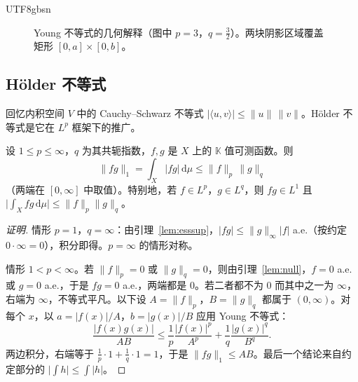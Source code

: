 \documentclass[11pt]{article}
\newcommand{\K}{\mathbb{K}}
\newcommand{\norm}[1]{\lVert #1\rVert}
\newcommand{\dmu}{\,\mathrm{d}\mu}
\begin{document}
\begin{CJK*}{UTF8}{gbsn}
\begin{figure}[H]
\centering
{}
\caption{Young 不等式的几何解释（图中 $p=3$，$q=\tfrac32$）。两块阴影区域覆盖矩形 $[0,a]\times[0,b]$。}
\label{fig:young}
\end{figure}

\subsection{Hölder 不等式}

回忆内积空间 $V$ 中的 Cauchy--Schwarz 不等式 $|\langle u,v\rangle|\le\norm{u}\,\norm{v}$。Hölder 不等式是它在 $L^{p}$ 框架下的推广。

\begin{theorem}\label{thm:holder}
设 $1\le p\le\infty$，$q$ 为其共轭指数，$f,g$ 是 $X$ 上的 $\K$ 值可测函数。则
\[
\norm{fg}_{1}=\int_{X}|fg|\dmu\le\norm{f}_{p}\,\norm{g}_{q}
\]
（两端在 $[0,\infty]$ 中取值）。特别地，若 $f\in L^{p}$，$g\in L^{q}$，则 $fg\in L^{1}$ 且 $\bigl|\int_{X}fg\dmu\bigr|\le\norm{f}_{p}\norm{g}_{q}$。
\end{theorem}

\begin{proof}[证明]
情形 $p=1$，$q=\infty$：由引理~\ref{lem:esssup}，$|fg|\le\norm{g}_{\infty}|f|$ a.e.（按约定 $0\cdot\infty=0$），积分即得。$p=\infty$ 的情形对称。

情形 $1<p<\infty$。若 $\norm{f}_{p}=0$ 或 $\norm{g}_{q}=0$，则由引理~\ref{lem:null}，$f=0$ a.e. 或 $g=0$ a.e.，于是 $fg=0$ a.e.，两端都是 $0$。若二者都不为 $0$ 而其中之一为 $\infty$，右端为 $\infty$，不等式平凡。以下设 $A=\norm{f}_{p}$，$B=\norm{g}_{q}$ 都属于 $(0,\infty)$。对每个 $x$，以 $a=|f(x)|/A$，$b=|g(x)|/B$ 应用 Young 不等式：
\[
\frac{|f(x)g(x)|}{AB}\le\frac{1}{p}\frac{|f(x)|^{p}}{A^{p}}+\frac{1}{q}\frac{|g(x)|^{q}}{B^{q}}.
\]
两边积分，右端等于 $\frac1p\cdot1+\frac1q\cdot1=1$，于是 $\norm{fg}_{1}\le AB$。最后一个结论来自约定部分的 $\bigl|\int h\bigr|\le\int|h|$。
\end{proof}


\end{CJK*}
\end{document}
